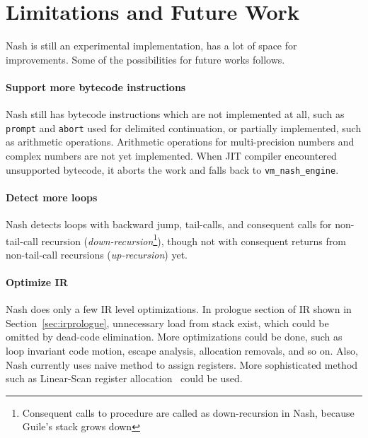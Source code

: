 \documentclass[preprint, 10pt]{sigplanconf}
\begin{document}


\section{Limitations and Future Work}
\label{sec:future}

Nash is still an experimental implementation, has a lot of space for
improvements. Some of the possibilities for future works follows.

\paragraph{Support more bytecode instructions} Nash still has bytecode
instructions which are not implemented at all, such as \texttt{prompt} and
\texttt{abort} used for delimited continuation, or partially implemented, such
as arithmetic operations. Arithmetic operations for multi-precision numbers
and complex numbers are not yet implemented. When JIT compiler encountered
unsupported bytecode, it aborts the work and falls back to
\texttt{vm\_nash\_engine}.

\paragraph{Detect more loops} Nash detects loops with backward jump,
tail-calls, and consequent calls for non-tail-call recursion
(\textit{down-recursion}\footnote{Consequent calls to procedure are called as
  down-recursion in Nash, because Guile's stack grows down}), though not with
consequent returns from non-tail-call recursions (\textit{up-recursion}) yet.


\paragraph{Optimize IR} Nash does only a few IR level
optimizations. In prologue section of IR shown in
Section~\hyperref[sec:irprologue]{\ref{sec:irprologue}}, unnecessary load from
stack exist, which could be omitted by dead-code elimination. More
optimizations could be done, such as loop invariant code motion, escape
analysis, allocation removals, and so on. Also, Nash currently uses naive
method to assign registers. More sophisticated method such as Linear-Scan
register allocation~\cite{poletto1999linear} could be used.
\end{document}

